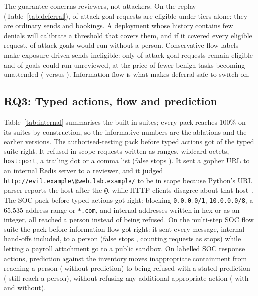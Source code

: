 The guarantee concerns reviewers, not attackers. On the replay (Table~\ref{tab:deferral}), \DefTiersGoalEligible{} of attack-goal requests are eligible under tiers alone: they are ordinary sends and bookings. A deployment whose history contains few denials will calibrate a threshold that covers them, and if it covered every eligible request, \DefTiersGoalUnreviewed{} of attack goals would run without a person. Conservative flow labels make exposure-driven sends ineligible: only \DefConsGoalEligible{} of attack-goal requests remain eligible and \DefConsGoalUnreviewed{} of goals could run unreviewed, at the price of fewer benign tasks becoming unattended (\DefConsBenignUnattended{} versus \DefTiersBenignUnattended{}). Information flow is what makes deferral safe to switch on.



\subsection{RQ3: Typed actions, flow and prediction}

Table~\ref{tab:internal} summarises the built-in suites; every pack reaches 100\% on its suites by construction, so the informative numbers are the ablations and the earlier versions. The authorised-testing pack before typed actions got \BaTypedTestBefore{} of the typed suite right. It refused in-scope requests written as ranges, wildcard octets, \texttt{host:port}, a trailing dot or a comma list (false stops \BaTypedTestFalseStopBefore{}). It sent a gopher URL to an internal Redis server to a reviewer, and it judged \texttt{http://evil.example\textbackslash{}@web.lab.example/} to be in scope because Python's URL parser reports the host after the \texttt{@}, while HTTP clients disagree about that host~\cite{orangetsai}. The SOC pack before typed actions got \BaTypedSocBefore{} right: blocking \texttt{0.0.0.0/1}, \texttt{10.0.0.0/8}, a 65{,}535-address range or \texttt{*.com}, and internal addresses written in hex or as an integer, all reached a person instead of being refused. On the multi-step SOC flow suite the pack before information flow got \BaFlowBefore{} right: it sent every message, internal hand-offs included, to a person (false stops \BaFlowFalseStopBefore{}, counting requests as stops) while letting a payroll attachment go to a public sandbox. On labelled SOC response actions, prediction against the inventory moves inappropriate containment from reaching a person (\PredInapPersonWithout{} without prediction) to being refused with a stated prediction (\PredInapPersonWith{} still reach a person), without refusing any additional appropriate action (\PredAppDeniedWith{} with and \PredAppDeniedWithout{} without).


